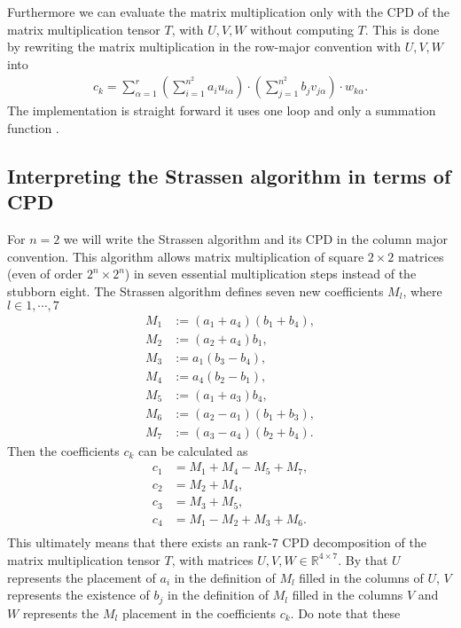 \documentclass[a4paper]{article}
\begin{document}
Furthermore we can evaluate the matrix multiplication only with the CPD of the
matrix multiplication tensor $T$, with $U, V, W$ without computing $T$. This
is done by rewriting the matrix multiplication in the row-major convention
with $U, V, W$ into
\begin{align}
    c_k = \sum_{\alpha=1}^r \left(\sum_{i=1}^{n^2} a_i
    u_{i\alpha}\right)\cdot
        \left(\sum_{j = 1}^{n^2} b_j v_{j\alpha}\right) \cdot w_{k\alpha}.
\end{align}
The implementation is straight forward it uses one loop and only a
summation function \cite{code}.
\subsection{Interpreting the Strassen algorithm in terms of CPD}
For $n=2$ we will write the Strassen algorithm and its CPD in the column
major convention. This algorithm allows matrix multiplication of square
$2\times2$ matrices (even of order $2^n\times 2^n$) in seven essential
multiplication steps instead of the stubborn eight. The Strassen algorithm
defines seven new coefficients $M_l$, where $l\in {1, \cdots, 7}$
\begin{align}
    M_1 &:= (a_1 + a_4)(b_1 + b_4), \\
    M_2 &:= (a_2 + a_4)b_1,\\
    M_3 &:= a_1(b_3 - b_4),\\
    M_4 &:= a_4(b_2 - b_1),\\
    M_5 &:= (a_1 + a_3)b_4,\\
    M_6 &:= (a_2 - a_1)(b_1 + b_3),\\
    M_7 &:= (a_3 - a_4)(b_2 + b_4).
\end{align}
Then the coefficients $c_k$ can be calculated as
\begin{align}
    c_1 &= M_1 + M_4 - M_5 + M_7,\\
    c_2 &= M_2 + M_4,\\
    c_3 &= M_3 + M_5,\\
    c_4 &= M_1 - M_2 + M_3 + M_6.\\
\end{align}
This ultimately means that there exists an rank-$7$ CPD decomposition of the
matrix multiplication tensor $T$, with matrices $U, V, W \in
\mathbb{R}^{4\times 7}$. By that $U$ represents the placement of $a_i$ in the
definition of $M_l$ filled in the columns of $U$, $V$ represents the existence
of $b_j$ in the definition of $M_l$ filled in the columns $V$ and $W$
represents the $M_l$ placement in the coefficients $c_k$. Do note that these
\end{document}
